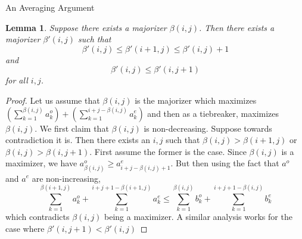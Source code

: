 \documentclass[11pt,a4paper]{article}
\newtheorem{lemma}[subsection]{Lemma}
\begin{document}
\begin{section}{An Averaging Argument}
\begin{lemma} \label{increasing}
Suppose there exists a majorizer $\beta(i,j)$. Then there exists a majorizer $\beta'(i, j)$ such that
\[
\beta'(i, j) \leq \beta'(i + 1, j) \leq \beta'(i, j) + 1
\]
and
\[
\beta'(i, j) \leq \beta'(i, j + 1)
\]
for all $i, j$.
\end{lemma}
\begin{proof}
Let us assume that $\beta(i,j)$ is the majorizer which maximizes $ \left ( \sum_{k = 1}^{\beta(i, j)} a^o_k \right ) + \left (\sum_{k = 1}^{ i + j - \beta(i, j) } a^e_k \right )$ and then as a tiebreaker, maximizes $\beta(i, j)$. We first claim that $\beta(i, j)$ is non-decreasing. Suppose towards contradiction it is. Then there exists an $i, j$ such that $\beta(i, j) > \beta(i + 1, j)$ or $\beta(i, j) > \beta(i, j + 1)$. First assume the former is the case. Since $\beta(i, j)$ is a maximizer, we have $a^o_{\beta(i, j)} \geq a^e_{i + j - \beta(i, j) + 1}$. But then using the fact that $a^o$ and $a^e$ are non-increasing,
\[
\sum_{k = 1}^{\beta(i + 1, j ) } a^o_k + \sum_{k = 1}^{i + j + 1 - \beta(i + 1, j) } a^e_k \leq \sum_{k = 1}^{\beta(i, j)} b^o_k + \sum_{k = 1}^{i + j + 1 - \beta(i, j)} b^e_k
\]
which contradicts $\beta(i, j)$ being a maximizer. A similar analysis works for the case where $\beta'(i, j + 1) < \beta'(i, j)$



\end{proof}
\end{section}
\end{document}
